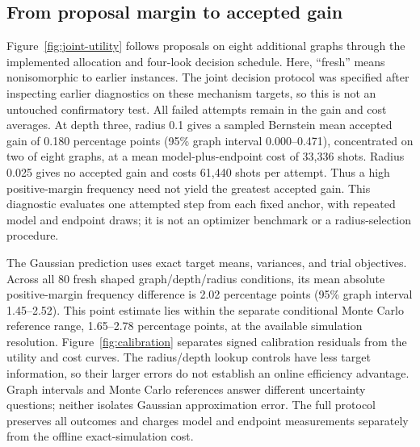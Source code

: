 \documentclass[11pt]{article}
\begin{document}
\subsection{From proposal margin to accepted gain}
\label{sec:joint-results}
Figure~\ref{fig:joint-utility} follows proposals on eight additional graphs
through the implemented allocation and four-look decision schedule.
Here, ``fresh'' means nonisomorphic to earlier instances. The joint
decision protocol was specified after inspecting earlier diagnostics on
these mechanism targets, so this is not an untouched confirmatory test.
All failed attempts remain in the gain and cost averages. At depth three,
radius 0.1 gives a sampled Bernstein mean accepted gain of 0.180
percentage points (95\% graph interval 0.000--0.471), concentrated on
two of eight graphs, at a mean model-plus-endpoint cost of 33,336 shots.
Radius 0.025 gives no accepted gain and costs 61,440 shots per attempt.
Thus a high positive-margin frequency need not yield the greatest accepted
gain. This diagnostic evaluates one attempted step from each fixed anchor,
with repeated model and endpoint draws; it is not an
optimizer benchmark or a radius-selection procedure.

The Gaussian prediction uses exact target means, variances, and trial
objectives. Across all 80 fresh shaped graph/depth/radius conditions,
its mean absolute positive-margin frequency difference is 2.02 percentage
points (95\% graph interval 1.45--2.52). This point estimate lies within
the separate conditional Monte Carlo reference range, 1.65--2.78
percentage points, at the available simulation resolution.
Figure~\ref{fig:calibration} separates signed calibration residuals
from the utility and cost curves. The radius/depth lookup controls have less target information, so their
larger errors do not establish an online efficiency advantage. Graph
intervals and Monte Carlo references answer different uncertainty questions;
neither isolates Gaussian approximation error. The full protocol preserves
all outcomes and charges model and endpoint measurements separately from
the offline exact-simulation cost.
\end{document}
